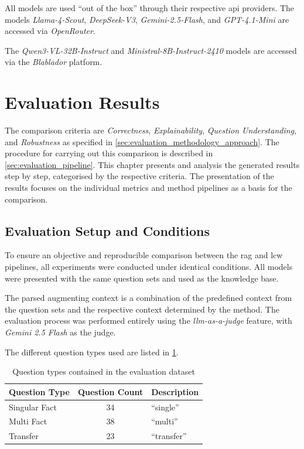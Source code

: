 All models are used \enquote{out of the box} through their respective \ac{api} providers.
The models \textit{Llama-4-Scout}, \textit{DeepSeek-V3}, \textit{Gemini-2.5-Flash}, and \textit{GPT-4.1-Mini} are accessed via \textit{OpenRouter}.

The \textit{Qwen3-VL-32B-Instruct} and \textit{Ministral-8B-Instruct-2410} models are accessed via the \textit{Blablador} platform.

\section{Evaluation Results}
The comparison criteria are \textit{Correctness}, \textit{Explainability}, \textit{Question Understanding}, and \textit{Robustness} as specified in \cref{sec:evaluation_methodology_approach}.
The procedure for carrying out this comparison is described in \cref{sec:evaluation_pipeline}.
This chapter presents and analysis the generated results step by step, categorised by the respective criteria.
The presentation of the results focuses on the individual metrics and method pipelines as a basis for the comparison.
%
\subsection{Evaluation Setup and Conditions}\label{subsec:eval_setup_conditions}

To ensure an objective and reproducible comparison between the \ac{rag} and \ac{lcw} pipelines, all experiments were conducted under identical conditions.
All models were presented with the same question sets and used  as the knowledge base.

The parsed augmenting context is a combination of the predefined context from the question sets and the respective context determined by the method.
The evaluation process was performed entirely using the \textit{llm-as-a-judge} feature, with \textit{Gemini 2.5 Flash} as the judge.

The different question types used are listed in \cref{tab:eval_question_types}.

\begin{table}[H]
    \centering
    \begin{tabular}{lcl}
        \toprule
        \textbf{Question Type} & \textbf{Question Count} & \textbf{Description} \\
        \midrule
        Singular Fact     & 34                         & \enquote{single}     \\
        Multi Fact      & 38                         & \enquote{multi}      \\
        Transfer          & 23                         & \enquote{transfer}   \\
        \bottomrule
    \end{tabular}
    \caption[Question types of the evaluation dataset]{Question types contained in the evaluation dataset}\label{tab:eval_question_types}
\end{table}
%

